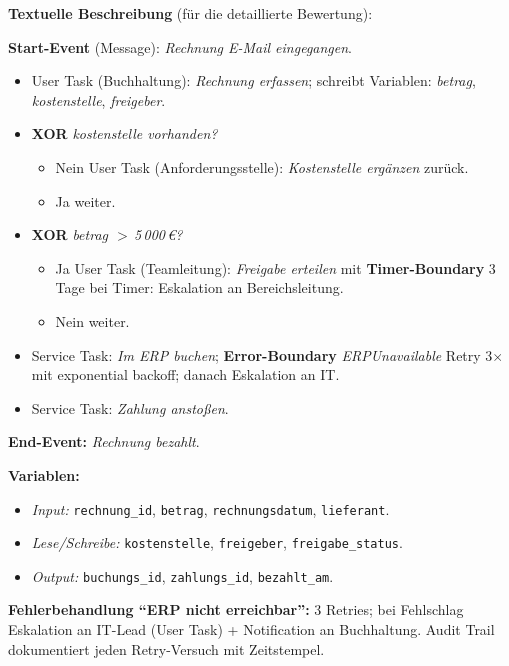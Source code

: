 \documentclass[11pt,a4paper,oneside]{article}
\newcommand{\fachbegriff}[1]{\textbf{#1}}
\begin{document}
\begin{loesungbox}
\smallskip
\textbf{Textuelle Beschreibung} (für die detaillierte Bewertung):

\smallskip
\textbf{Start-Event} (Message): \emph{Rechnung E-Mail eingegangen}.
\begin{itemize}
  \item User Task (Buchhaltung): \emph{Rechnung erfassen}; schreibt Variablen: \emph{betrag}, \emph{kostenstelle}, \emph{freigeber}.
  \item \textbf{XOR} \emph{kostenstelle vorhanden?}
  \begin{itemize}
    \item Nein \textrightarrow{} User Task (Anforderungsstelle): \emph{Kostenstelle erg\"anzen} \textrightarrow{} zur\"uck.
    \item Ja \textrightarrow{} weiter.
  \end{itemize}
  \item \textbf{XOR} \emph{betrag $>$\,5\,000\,\euro?}
  \begin{itemize}
    \item Ja \textrightarrow{} User Task (Teamleitung): \emph{Freigabe erteilen} mit \fachbegriff{Timer-Boundary} 3\,Tage \textrightarrow{} bei Timer: Eskalation an Bereichsleitung.
    \item Nein \textrightarrow{} weiter.
  \end{itemize}
  \item Service Task: \emph{Im ERP buchen}; \fachbegriff{Error-Boundary} \emph{ERPUnavailable} \textrightarrow{} Retry 3$\times$ mit exponential backoff; danach Eskalation an IT.
  \item Service Task: \emph{Zahlung ansto{\ss}en}.
\end{itemize}
\textbf{End-Event:} \emph{Rechnung bezahlt}.

\smallskip
\textbf{Variablen:}
\begin{itemize}
  \item \emph{Input:} \texttt{rechnung\_id}, \texttt{betrag}, \texttt{rechnungsdatum}, \texttt{lieferant}.
  \item \emph{Lese/Schreibe:} \texttt{kostenstelle}, \texttt{freigeber}, \texttt{freigabe\_status}.
  \item \emph{Output:} \texttt{buchungs\_id}, \texttt{zahlungs\_id}, \texttt{bezahlt\_am}.
\end{itemize}

\smallskip
\textbf{Fehlerbehandlung ``ERP nicht erreichbar'':} 3 Retries; bei Fehlschlag Eskalation an IT-Lead (User Task) + Notification an Buchhaltung. Audit Trail dokumentiert jeden Retry-Versuch mit Zeitstempel.
\end{loesungbox}
\end{document}
